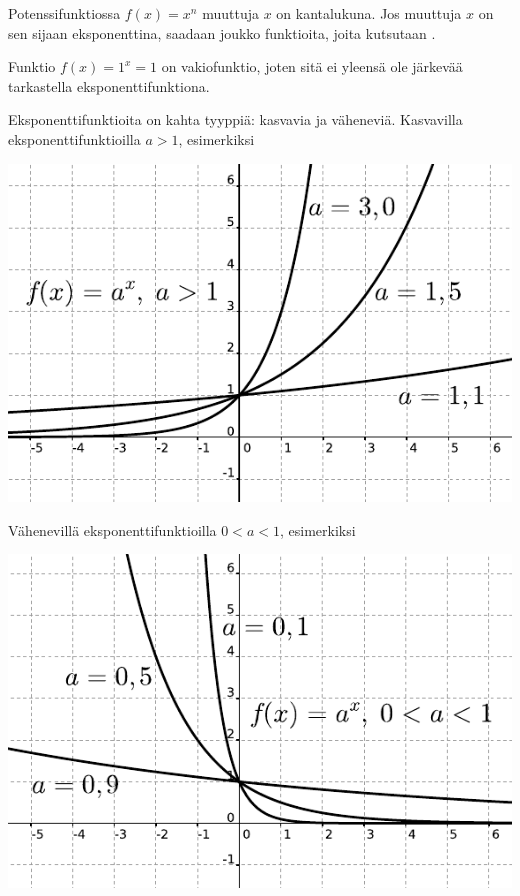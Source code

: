 Potenssifunktiossa $f(x) = x^n$ muuttuja $x$ on kantalukuna. Jos muuttuja $x$ on sen sijaan eksponenttina, saadaan joukko funktioita, joita kutsutaan .


Funktio $f(x) = 1^x = 1$ on vakiofunktio, joten sitä ei yleensä ole järkevää tarkastella eksponenttifunktiona.

Eksponenttifunktioita on kahta tyyppiä: kasvavia ja väheneviä.
Kasvavilla eksponenttifunktioilla $a>1$, esimerkiksi

\begin{center}
\includegraphics{pictures/apotenssiinxaisompikuinyksi.pdf}
\end{center}

Vähenevillä eksponenttifunktioilla $0<a<1$, esimerkiksi

\begin{center}
\includegraphics{pictures/apotenssiinxaisompikuinnolla.pdf}
\end{center}


